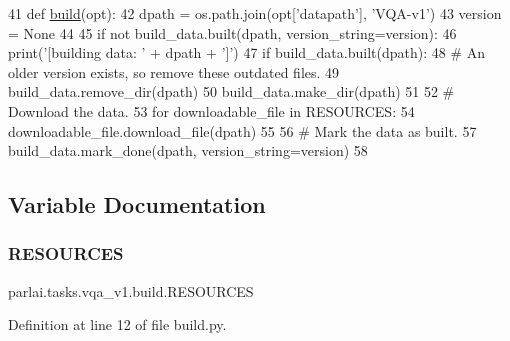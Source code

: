 \begin{DoxyCode}
41 \textcolor{keyword}{def }\hyperlink{namespacedialog__babi__feedback_1_1build_a7a9d289f7493a5ded13c4b7f071b6184}{build}(opt):
42     dpath = os.path.join(opt[\textcolor{stringliteral}{'datapath'}], \textcolor{stringliteral}{'VQA-v1'})
43     version = \textcolor{keywordtype}{None}
44 
45     \textcolor{keywordflow}{if} \textcolor{keywordflow}{not} build\_data.built(dpath, version\_string=version):
46         print(\textcolor{stringliteral}{'[building data: '} + dpath + \textcolor{stringliteral}{']'})
47         \textcolor{keywordflow}{if} build\_data.built(dpath):
48             \textcolor{comment}{# An older version exists, so remove these outdated files.}
49             build\_data.remove\_dir(dpath)
50         build\_data.make\_dir(dpath)
51 
52         \textcolor{comment}{# Download the data.}
53         \textcolor{keywordflow}{for} downloadable\_file \textcolor{keywordflow}{in} RESOURCES:
54             downloadable\_file.download\_file(dpath)
55 
56         \textcolor{comment}{# Mark the data as built.}
57         build\_data.mark\_done(dpath, version\_string=version)
58 \end{DoxyCode}


\subsection{Variable Documentation}
\mbox{\label{namespaceparlai_1_1tasks_1_1vqa__v1_1_1build_afbcd8a400d98f5eee70f1aec3f74f54b}} 
\subsubsection{\texorpdfstring{R\+E\+S\+O\+U\+R\+C\+ES}{RESOURCES}}
{\footnotesize\ttfamily parlai.\+tasks.\+vqa\+\_\+v1.\+build.\+R\+E\+S\+O\+U\+R\+C\+ES}



Definition at line 12 of file build.\+py.

